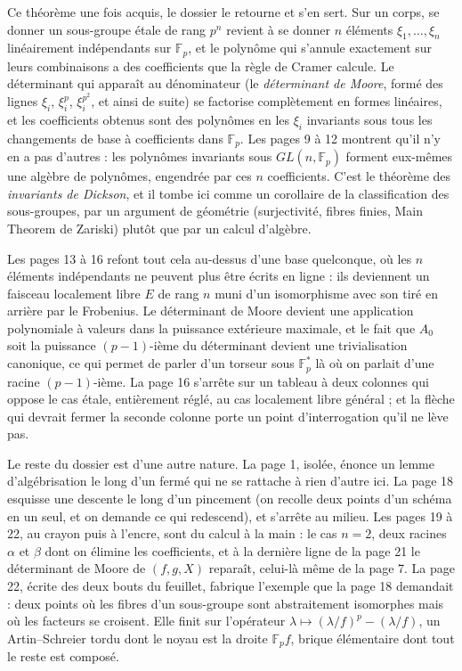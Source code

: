 \documentclass[11pt,a4paper]{article}
\begin{document}
\begin{resume}
Ce théorème une fois acquis, le dossier le retourne et s'en sert. Sur un
corps, se donner un sous-groupe étale de rang $p^n$ revient à se donner $n$
éléments $\xi_1, \dots, \xi_n$ linéairement indépendants sur $\mathbb{F}_p$,
et le polynôme qui s'annule exactement sur leurs combinaisons a des
coefficients que la règle de Cramer calcule. Le déterminant qui apparaît au
dénominateur (le \emph{déterminant de Moore}, formé des lignes $\xi_i$,
$\xi_i^p$, $\xi_i^{p^2}$, et ainsi de suite) se factorise complètement en
formes linéaires, et les coefficients obtenus sont des polynômes en les
$\xi_i$ invariants sous tous les changements de base à coefficients dans
$\mathbb{F}_p$. Les pages 9 à 12 montrent qu'il n'y en a pas d'autres : les
polynômes invariants sous $GL(n, \mathbb{F}_p)$ forment eux-mêmes une algèbre
de polynômes, engendrée par ces $n$ coefficients. C'est le théorème des
\emph{invariants de Dickson}, et il tombe ici comme un corollaire de la
classification des sous-groupes, par un argument de géométrie (surjectivité,
fibres finies, Main Theorem de Zariski) plutôt que par un calcul d'algèbre.

Les pages 13 à 16 refont tout cela au-dessus d'une base quelconque, où les
$n$ éléments indépendants ne peuvent plus être écrits en ligne : ils
deviennent un faisceau localement libre $E$ de rang $n$ muni d'un
isomorphisme avec son tiré en arrière par le Frobenius. Le déterminant de
Moore devient une application polynomiale à valeurs dans la puissance
extérieure maximale, et le fait que $A_0$ soit la puissance $(p-1)$-ième du
déterminant devient une trivialisation canonique, ce qui permet de
parler d'un torseur sous $\mathbb{F}_p^*$ là où on parlait d'une racine
$(p-1)$-ième. La page 16 s'arrête sur un tableau à deux colonnes qui oppose
le cas étale, entièrement réglé, au cas localement libre général ; et la
flèche qui devrait fermer la seconde colonne porte un point d'interrogation
qu'il ne lève pas.

Le reste du dossier est d'une autre nature. La page 1, isolée, énonce un
lemme d'algébrisation le long d'un fermé qui ne se rattache à rien d'autre
ici. La page 18 esquisse une descente le long d'un pincement (on recolle
deux points d'un schéma en un seul, et on demande ce qui redescend), et
s'arrête au milieu. Les pages 19 à 22, au crayon puis à l'encre, sont du
calcul à la main : le cas $n = 2$, deux racines $\alpha$ et $\beta$ dont on
élimine les coefficients, et à la dernière ligne de la page 21 le déterminant
de Moore de $(f, g, X)$ reparaît, celui-là même de la page 7. La page 22,
écrite des deux bouts du feuillet, fabrique l'exemple que la page 18
demandait : deux points où les fibres d'un sous-groupe sont abstraitement
isomorphes mais où les facteurs se croisent. Elle finit sur l'opérateur
$\lambda \mapsto (\lambda/f)^p - (\lambda/f)$, un Artin--Schreier tordu dont
le noyau est la droite $\mathbb{F}_p f$, brique élémentaire
dont tout le reste est composé.


\end{resume}
\end{document}
